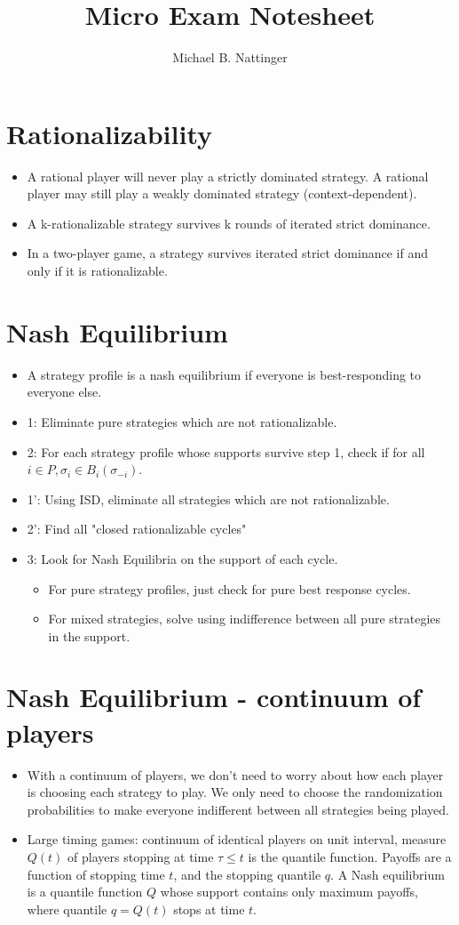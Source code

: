 \documentclass[11pt]{article} %
\title{Micro Exam Notesheet}
\author{Michael B. Nattinger}
\begin{document}
\maketitle

\section{Rationalizability}
\begin{itemize}
\item A rational player will never play a strictly dominated strategy. A rational player may still play a weakly dominated strategy (context-dependent).
\item A k-rationalizable strategy survives k rounds of iterated strict dominance.
\item In a two-player game, a strategy survives iterated strict dominance if and only if it is rationalizable.
\end{itemize}
\section{Nash Equilibrium}
\begin{itemize}
\item A strategy profile is a nash equilibrium if everyone is best-responding to everyone else.
\item 1: Eliminate pure strategies which are not rationalizable.
\item 2: For each strategy profile whose supports survive step 1, check if for all $i \in P, \sigma_i \in B_i(\sigma_{-i})$.
\item 1': Using ISD, eliminate all strategies which are not rationalizable.
\item 2': Find all "closed rationalizable cycles"
\item 3: Look for Nash Equilibria on the support of each cycle.
\begin{itemize}
\item For pure strategy profiles, just check for pure best response cycles.
\item For mixed strategies, solve using indifference between all pure strategies in the support.
\end{itemize}
\end{itemize}
\section{Nash Equilibrium - continuum of players}
\begin{itemize}
\item With a continuum of players, we don't need to worry about how each player is choosing each strategy to play. We only need to choose the randomization probabilities to make everyone indifferent between all strategies being played.
\item Large timing games: continuum of identical players on unit interval, measure $Q(t)$ of players stopping at time $\tau\leq t$ is the quantile function. Payoffs are a function of stopping time $t$, and the stopping quantile $q$. A Nash equilibrium is a quantile function $Q$ whose support contains only maximum payoffs, where quantile $q=Q(t)$ stops at time $t$.
\end{itemize}
\end{document}
